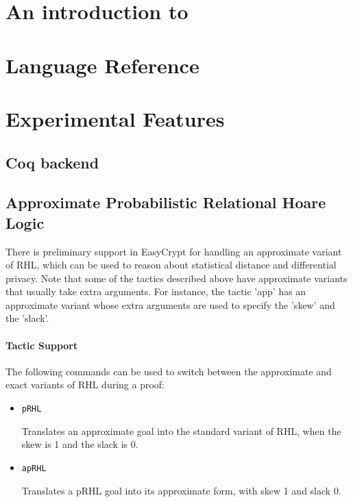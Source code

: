 \documentclass[a4paper,notitlepage]{book}
\begin{document}

\tableofcontents

% 

\part{An introduction to \EasyCrypt}
  

\part{Language Reference}
  

\iffalse
\part{Experimental Features}
  \chapter{Coq backend}
  \chapter{Approximate Probabilistic Relational Hoare Logic}
  There is preliminary support in EasyCrypt for handling an
  approximate variant of RHL, which can be used to reason about
  statistical distance and differential privacy. Note that some of the
  tactics described above have approximate variants that usually take
  extra arguments. For instance, the tactic 'app' has an approximate
  variant whose extra arguments are used to specify the 'skew' and the
  'slack'.

  \subsection{Tactic Support}
  The following commands can be used to switch between the approximate
  and exact variants of RHL during a proof:

  \begin{itemize}
  \item \verb+pRHL+

    Translates an approximate goal into the standard variant of RHL,
    when the skew is 1 and the slack is 0.

  \item \verb+apRHL+

    Translates a pRHL goal into its approximate form, with skew 1 and
    slack 0.
  \end{itemize}
\end{document}
